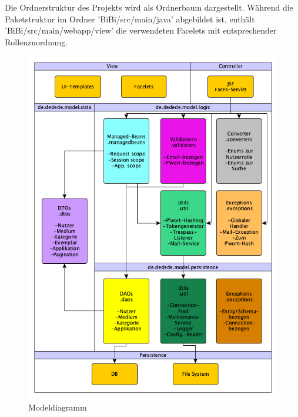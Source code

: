 \documentclass{article}
\begin{document}
Die Ordnerstruktur des Projekts wird als Ordnerbaum dargestellt.
Während die Paketstruktur im Ordner 'BiBi/src/main/java' abgebildet ist, enthält 'BiBi/src/main/webapp/view' die verwendeten Facelets mit entsprechender Rollenzuordnung. \vspace{0.5em}

\begin{figure}[H]
\centering
\includegraphics[width = 40em]{Modeldiagramm}
\caption{Modeldiagramm}
\end{figure}
\end{document}
